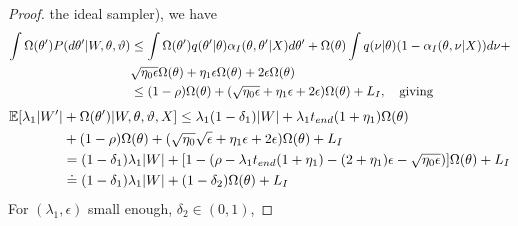 \begin{proof}
the ideal sampler), we have 
\begin{align*}
  \int \Omega(\theta') P(d\theta'| W, \theta, \vartheta)
  & \leq \int \Omega(\theta') q(\theta' | \theta)\alpha_I(\theta, \theta'| X) d\theta'  + \Omega(\theta)\int  q(\nu | \theta) (1 - \alpha_I(\theta, \nu | X)) d\nu+ \\
  &\sqrt{\eta_0\epsilon}\Omega(\theta)  +  \eta_1 \epsilon \Omega(\theta) + 2\epsilon \Omega(\theta)\\
  & \leq (1 - \rho) \Omega(\theta) + (\sqrt{\eta_0\epsilon} +  \eta_1 \epsilon + 2\epsilon) \Omega(\theta) + L_I, \quad \text{giving}
\end{align*}
\begin{align*}
\mathbb{E}[\lambda_1 | W'| &+ \Omega(\theta')| W, \theta, \vartheta, X] \le \lambda_1(1 - \delta_1)|W| + \lambda_1 t_{end} (1 + \eta_1)\Omega(\theta)\\
&+  (1 - \rho) \Omega(\theta) + (\sqrt{\eta_0} \sqrt{\epsilon} +  \eta_1 \epsilon + 2\epsilon) \Omega(\theta) + L_I\\
& = (1 - \delta_1)\lambda_1 |W| + [1 - (\rho - \lambda_1 t_{end} (1 + \eta_1) - (2 + \eta_1)\epsilon - \sqrt{\eta_0 \epsilon})]\Omega(\theta) + L_I\\
& \doteq (1 - \delta_1)\lambda_1 |W| + (1 - \delta_2)\Omega(\theta) + L_I
\end{align*}
For $(\lambda_1,\epsilon)$ small enough, $\delta_2 \in (0,1)$, 

\end{proof}

